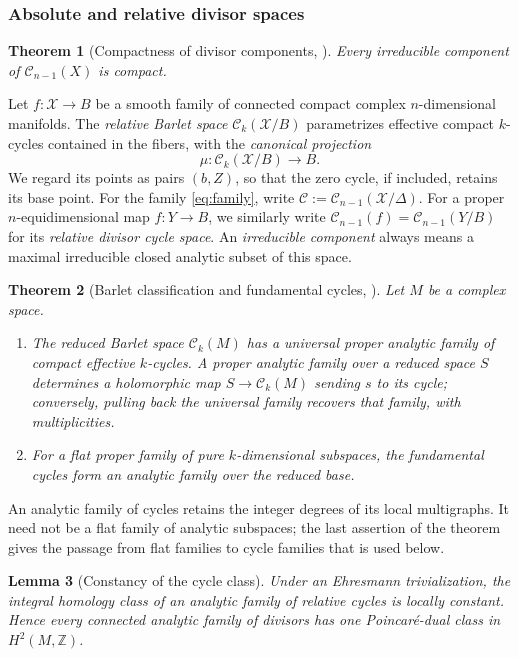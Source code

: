 \documentclass[11pt]{amsart}
\numberwithin{equation}{section}
\theoremstyle{plain}
\newtheorem{thm}{Theorem}[section]
\newtheorem{lemma}[thm]{Lemma}
\theoremstyle{definition}
\newcommand{\Z}{\mathbb Z}
\newcommand{\cC}{\mathcal C}
\newcommand{\cX}{\mathcal X}
\begin{document}
\subsubsection{Absolute and relative divisor spaces}
\begin{thm}[Compactness of divisor components,
{\cite[Theorem~6.0.13]{Ba15}}]
\label{thm:revised-absolute-divisors}
Every irreducible component of $\cC_{n-1}(X)$ is compact.
\end{thm}

Let $f:\cX\to B$ be a smooth family of connected compact complex
$n$-dimensional manifolds.  The \emph{relative Barlet space}
$\cC_k(\cX/B)$ parametrizes effective compact $k$-cycles contained
in the fibers, with the \emph{canonical projection}
\[
 \mu:\cC_k(\cX/B)\longrightarrow B.
\]
We regard its points as pairs $(b,Z)$, so that the zero cycle, if
included, retains its base point.  For the family \eqref{eq:family},
write $\mathscr C:=\cC_{n-1}(\cX/\Delta)$.
For a proper $n$-equidimensional map $f:Y\to B$, we similarly write
$\cC_{n-1}(f)=\cC_{n-1}(Y/B)$ for its \emph{relative divisor cycle space}.
An \emph{irreducible component} always means a maximal irreducible closed
analytic subset of this space.

\begin{thm}[Barlet classification and fundamental cycles,
{\cite[Theorems~1.8--1.9, Main Theorem, and Corollary~3.3]{Ma07}}]
\label{thm:revised-cycle-universal}
Let $M$ be a complex space.
\begin{enumerate}[$(i)$]
\item The reduced Barlet space $\cC_k(M)$ has a universal proper
analytic family of compact effective $k$-cycles.  A proper analytic
family over a reduced space $S$ determines a holomorphic map
$S\to\cC_k(M)$ sending $s$ to its cycle; conversely, pulling back the
universal family recovers that family, with multiplicities.
\item For a flat proper family of pure $k$-dimensional subspaces,
the fundamental cycles form an analytic family over the reduced base.
\end{enumerate}
\end{thm}

An analytic family of cycles retains the integer degrees of its local
multigraphs.  It need not be a flat family of analytic subspaces; the
last assertion of the theorem gives the passage from flat families to
cycle families that is used below.

\begin{lemma}[Constancy of the cycle class]
\label{lem:revised-cycle-class}
Under an Ehresmann trivialization, the integral homology class of an analytic
family of relative cycles is locally constant.  Hence every connected
analytic family of divisors has one Poincar\'e-dual class in $H^2(M,\Z)$.
\end{lemma}
\end{document}

